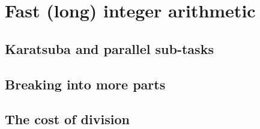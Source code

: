 \section{Fast (long) integer arithmetic}
\subsection{Karatsuba and parallel sub-tasks}
\subsection{Breaking into more parts}
\subsection{The cost of division}
